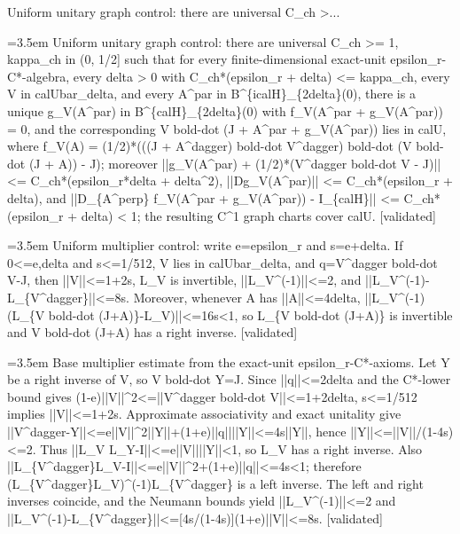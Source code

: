 \documentclass{article}
\newcommand{\step}[1]{\par\noindent\hangindent=3.5em\hangafter=1%
  \makebox[3.5em][l]{\textbf{#1.}}}
\newcommand{\steptag}[1]{\hfill{\small\textsf{[#1]}}}
\begin{document}
\begin{proofbox}{Uniform unitary graph control: there are universal C\_ch >...}
\step{1} Uniform unitary graph control: there are universal C\_ch >= 1, kappa\_ch in (0, 1/2] such that for every finite-dimensional exact-unit epsilon\_r-C*-algebra, every delta > 0 with C\_ch*(epsilon\_r + delta) <= kappa\_ch, every V in calUbar\_delta, and every A\textasciicircum{}par in B\textasciicircum{}\{icalH\}\_\{2delta\}(0), there is a unique g\_V(A\textasciicircum{}par) in B\textasciicircum{}\{calH\}\_\{2delta\}(0) with f\_V(A\textasciicircum{}par + g\_V(A\textasciicircum{}par)) = 0, and the corresponding V bold-dot (J + A\textasciicircum{}par + g\_V(A\textasciicircum{}par)) lies in calU, where f\_V(A) = (1/2)*(((J + A\textasciicircum{}dagger) bold-dot V\textasciicircum{}dagger) bold-dot (V bold-dot (J + A)) - J); moreover ||g\_V(A\textasciicircum{}par) + (1/2)*(V\textasciicircum{}dagger bold-dot V - J)|| <= C\_ch*(epsilon\_r*delta + delta\textasciicircum{}2), ||Dg\_V(A\textasciicircum{}par)|| <= C\_ch*(epsilon\_r + delta), and ||D\_\{A\textasciicircum{}perp\} f\_V(A\textasciicircum{}par + g\_V(A\textasciicircum{}par)) - I\_\{calH\}|| <= C\_ch*(epsilon\_r + delta) < 1; the resulting C\textasciicircum{}1 graph charts cover calU. \steptag{validated} \\[6pt]
\step{1.1} Uniform multiplier control: write e=epsilon\_r and s=e+delta. If 0<=e,delta and s<=1/512, V lies in calUbar\_delta, and q=V\textasciicircum{}dagger bold-dot V-J, then ||V||<=1+2s, L\_V is invertible, ||L\_V\textasciicircum{}(-1)||<=2, and ||L\_V\textasciicircum{}(-1)-L\_\{V\textasciicircum{}dagger\}||<=8s. Moreover, whenever A has ||A||<=4delta, ||L\_V\textasciicircum{}(-1)(L\_\{V bold-dot (J+A)\}-L\_V)||<=16s<1, so L\_\{V bold-dot (J+A)\} is invertible and V bold-dot (J+A) has a right inverse. \steptag{validated} \\[6pt]
\step{1.1.1} Base multiplier estimate from the exact-unit epsilon\_r-C*-axioms. Let Y be a right inverse of V, so V bold-dot Y=J. Since ||q||<=2delta and the C*-lower bound gives (1-e)||V||\textasciicircum{}2<=||V\textasciicircum{}dagger bold-dot V||<=1+2delta, s<=1/512 implies ||V||<=1+2s. Approximate associativity and exact unitality give ||V\textasciicircum{}dagger-Y||<=e||V||\textasciicircum{}2||Y||+(1+e)||q||||Y||<=4s||Y||, hence ||Y||<=||V||/(1-4s)<=2. Thus ||L\_V L\_Y-I||<=e||V||||Y||<1, so L\_V has a right inverse. Also ||L\_\{V\textasciicircum{}dagger\}L\_V-I||<=e||V||\textasciicircum{}2+(1+e)||q||<=4s<1; therefore (L\_\{V\textasciicircum{}dagger\}L\_V)\textasciicircum{}(-1)L\_\{V\textasciicircum{}dagger\} is a left inverse. The left and right inverses coincide, and the Neumann bounds yield ||L\_V\textasciicircum{}(-1)||<=2 and ||L\_V\textasciicircum{}(-1)-L\_\{V\textasciicircum{}dagger\}||<=[4s/(1-4s)](1+e)||V||<=8s. \steptag{validated} \\[4pt]

\end{proofbox}
\end{document}
